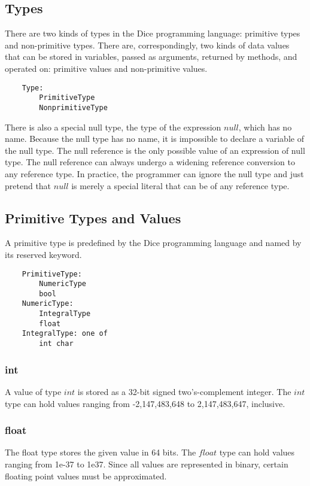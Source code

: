 \begin{homeworkProblem}
	\section{Types}
    There are two kinds of types in the Dice programming language: primitive types and non-primitive types.  There are, correspondingly, two kinds of data values that can be stored in variables, passed as arguments, returned by methods, and operated on: primitive values and non-primitive values.\\
	\begin{verbatim}
    Type:
        PrimitiveType
        NonprimitiveType
    \end{verbatim}
    There is also a special null type, the type of the expression $null$, which has no name. Because the null type has no name, it is impossible to declare a variable of the null type. The null reference is the only possible value of an expression of null type. The null reference can always undergo a widening reference conversion to any reference type. In practice, the programmer can ignore the null type and just pretend that $null$ is merely a special literal that can be of any reference type.\\

	\subsection{Primitive Types and Values}
    A primitive type is predefined by the Dice programming language and named by its reserved keyword.
    \begin{verbatim}
    PrimitiveType:
        NumericType
        bool
    NumericType:
        IntegralType
        float
    IntegralType: one of
        int char
    \end{verbatim}
    
    \subsubsection{int}
	A value of type $int$ is stored as a 32-bit signed two's-complement integer. The $int$ type can hold values ranging from -2,147,483,648 to 2,147,483,647, inclusive.

	\subsubsection{float}

	The float type stores the given value in 64 bits. The $float$ type can hold values ranging from 1e-37 to 1e37. Since all values are represented in binary, certain floating point values must be approximated.


\end{homeworkProblem}
